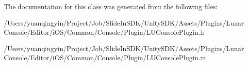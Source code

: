 The documentation for this class was generated from the following files\+:\begin{DoxyCompactItemize}
\item 
/\+Users/yuanqingyin/\+Project/\+Job/\+Slide\+In\+S\+D\+K/\+Unity\+S\+D\+K/\+Assets/\+Plugins/\+Lunar\+Console/\+Editor/i\+O\+S/\+Common/\+Console/\+Plugin/L\+U\+Console\+Plugin.\+h\item 
/\+Users/yuanqingyin/\+Project/\+Job/\+Slide\+In\+S\+D\+K/\+Unity\+S\+D\+K/\+Assets/\+Plugins/\+Lunar\+Console/\+Editor/i\+O\+S/\+Common/\+Console/\+Plugin/L\+U\+Console\+Plugin.\+m\end{DoxyCompactItemize}
